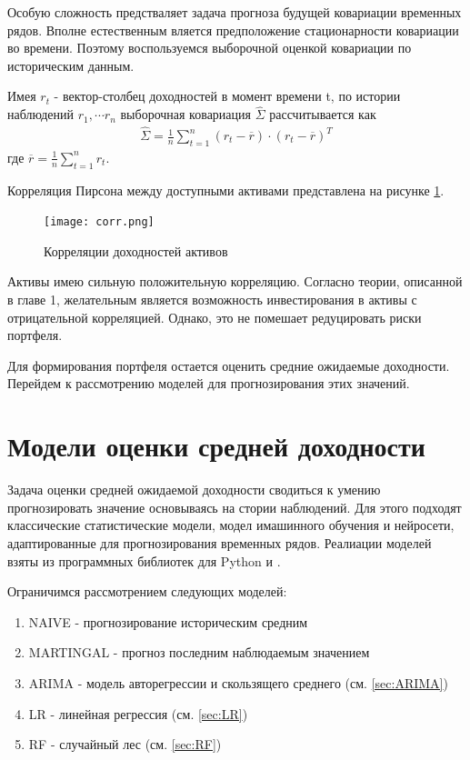 Особую сложность предстваляет задача прогноза будущей ковариации временных рядов. 
Вполне естественным вляется предположение стационарности ковариации во времени. 
Поэтому воспользуемся выборочной оценкой ковариации по историческим данным.

Имея $r_t$ - вектор-столбец доходностей в момент времени t, по истории наблюдений $r_1, \cdots r_n$ 
выборочная ковариация $\hat{\Sigma}$ рассчитывается как 
\begin{align}
	\hat{\Sigma} = \frac{1}{n} \sum_{t=1}^{n}(r_t - \overline{r}) \cdot (r_t - \overline{r})^T
\end{align}
где $\overline{r} = \frac{1}{n} \sum_{t=1}^{n} r_t$.

Корреляция Пирсона между доступными активами представлена на рисунке \ref{fig:corr}.

\begin{figure}[H]
	\centering
	\texttt{[image: corr.png]}
	\caption{Корреляции доходностей активов}
	\label{fig:corr}
\end{figure}

Активы имею сильную положительную корреляцию. Согласно теории, описанной в главе 1, желательным является
возможность инвестирования в активы с отрицательной корреляцией. Однако, это не помешает редуцировать риски портфеля.

Для формирования портфеля остается оценить средние ожидаемые доходности. Перейдем к рассмотрению моделей для
прогнозирования этих значений.

\section{Модели оценки средней доходности}

Задача оценки средней ожидаемой доходности сводиться к умению прогнозировать значение основываясь на стории наблюдений.
Для этого подходят классические статистические модели, модел имашинного обучения и нейросети, адаптированные для прогнозирования 
временных рядов. Реалиации моделей взяты из программных библиотек для Python \cite{skforecast} и \cite{sklearn}.

Ограничимся рассмотрением следующих моделей:
\begin{enumerate}
	\item NAIVE - прогнозирование историческим средним
	\item MARTINGAL - прогноз последним наблюдаемым значением
	\item ARIMA - модель авторегрессии и скользящего среднего (см. \ref{sec:ARIMA})
	\item LR - линейная регрессия (см. \ref{sec:LR})
	\item RF - случайный лес (см. \ref{sec:RF})
\end{enumerate}

